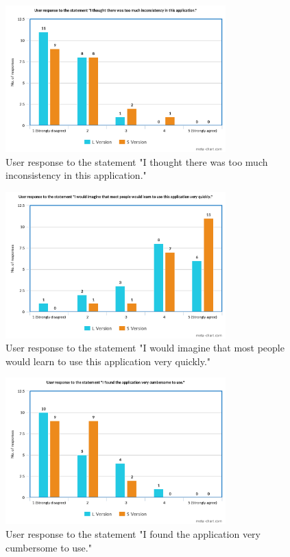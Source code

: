 \documentclass[journal]{./IEEE/IEEEtran}
\begin{document}
\begin{figure}[!ht]
\begin{center}

\includegraphics[width=85mm]{images/s6.png}
\caption{User response to the statement "I thought there was too much inconsistency in this application."}

\end{center}
\end{figure}

\begin{figure}[!ht]
\begin{center}

\includegraphics[width=85mm]{images/s7.png}
\caption{User response to the statement "I would imagine that most people would learn to use this application very quickly."}

\end{center}
\end{figure}

\begin{figure}[!ht]
\begin{center}

\includegraphics[width=85mm]{images/s8.png}
\caption{User response to the statement "I found the application very cumbersome to use."}

\end{center}
\end{figure}
\end{document}
